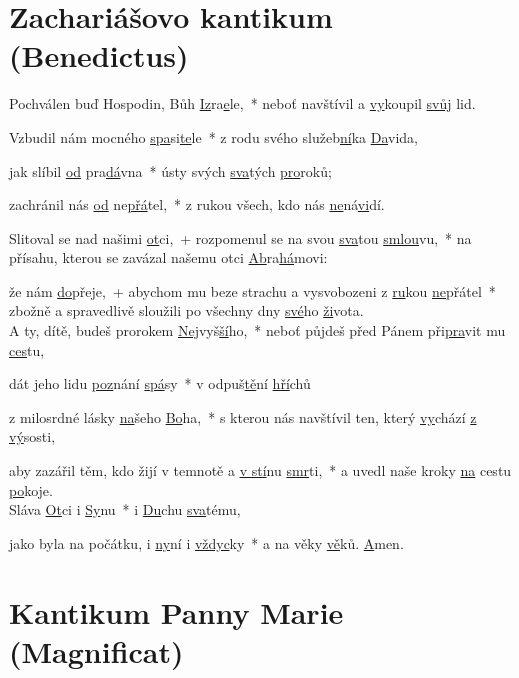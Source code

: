 \documentclass[12pt, a4paper]{article}
\begin{document}
\section*{Zachariášovo kantikum (Benedictus)}

Pochválen buď Hospodin, Bůh \underline{Iz}ra\underline{e}le,~* neboť navštívil a \underline{vy}koupil \underline{svůj} lid. 

Vzbudil nám mocného \underline{spa}si\underline{te}le~* z rodu svého služeb\underline{ní}ka \underline{Da}vida, 

jak slíbil \underline{od} pra\underline{dá}vna~* ústy svých \underline{sva}tých \underline{pro}roků; 

zachránil nás \underline{od} ne\underline{přá}tel,~* z rukou všech, kdo nás \underline{ne}ná\underline{vi}dí. 

Slitoval se nad našimi \underline{ot}ci,~+ rozpomenul se na svou \underline{sva}tou \underline{smlou}vu,~* na přísahu, kterou se zavázal našemu otci \underline{Ab}ra\underline{há}movi: 

že nám \underline{do}přeje,~+ abychom mu beze strachu a vysvobozeni z \underline{ru}kou \underline{ne}přátel~* zbožně a spravedlivě sloužili po všechny dny \underline{své}ho \underline{ži}vota.\\



A ty, dítě, budeš prorokem \underline{Nej}vyš\underline{ší}ho,~* neboť půjdeš před Pánem při\underline{pra}vit mu \underline{ces}tu, 

dát jeho lidu \underline{poz}nání \underline{spá}sy~* v odpuš\underline{tě}ní \underline{hří}chů 

z milosrdné lásky \underline{na}šeho \underline{Bo}ha,~* s kterou nás navštívil ten, který \underline{vy}chází \underline{z vý}sosti, 

aby zazářil těm, kdo žijí v temnotě a \underline{v stí}nu \underline{smr}ti,~* a uvedl naše kroky \underline{na} cestu \underline{po}koje.\\



Sláva \underline{Ot}ci i \underline{Sy}nu~* i \underline{Du}chu \underline{sva}tému, 

jako byla na počátku, i \underline{ny}ní i \underline{vždyc}ky~* a na věky \underline{vě}ků. \underline{A}men.

\pagebreak

\section*{Kantikum Panny Marie (Magnificat)}
\end{document}
